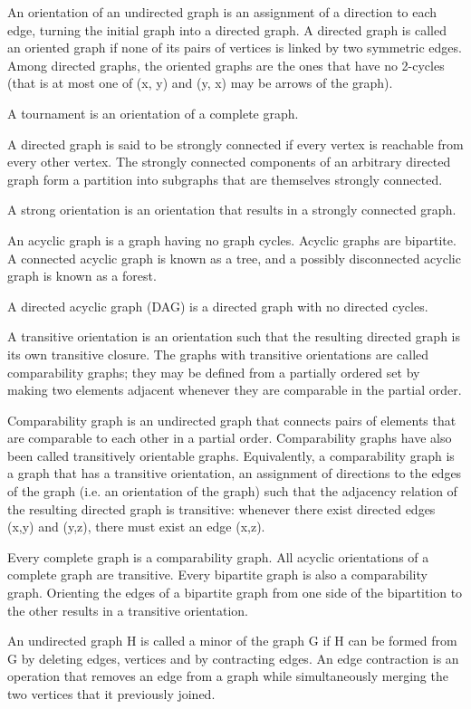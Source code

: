 \documentclass{article}
\begin{document}
An orientation of an undirected graph is an assignment of a direction to each edge, turning the initial graph into a directed graph. A directed graph is called an oriented graph if none of its pairs of vertices is linked by two symmetric edges. Among directed graphs, the oriented graphs are the ones that have no 2-cycles (that is at most one of (x, y) and (y, x) may be arrows of the graph).

A tournament is an orientation of a complete graph.

A directed graph is said to be strongly connected if every vertex is reachable from every other vertex. The strongly connected components of an arbitrary directed graph form a partition into subgraphs that are themselves strongly connected.

A strong orientation is an orientation that results in a strongly connected graph.

An acyclic graph is a graph having no graph cycles. Acyclic graphs are bipartite. A connected acyclic graph is known as a tree, and a possibly disconnected acyclic graph is known as a forest.

A directed acyclic graph (DAG) is a directed graph with no directed cycles.

A transitive orientation is an orientation such that the resulting directed graph is its own transitive closure. The graphs with transitive orientations are called comparability graphs; they may be defined from a partially ordered set by making two elements adjacent whenever they are comparable in the partial order.

Comparability graph is an undirected graph that connects pairs of elements that are comparable to each other in a partial order. Comparability graphs have also been called transitively orientable graphs.
Equivalently, a comparability graph is a graph that has a transitive orientation, an assignment of directions to the edges of the graph (i.e. an orientation of the graph) such that the adjacency relation of the resulting directed graph is transitive: whenever there exist directed edges (x,y) and (y,z), there must exist an edge (x,z).

Every complete graph is a comparability graph. All acyclic orientations of a complete graph are transitive. Every bipartite graph is also a comparability graph. Orienting the edges of a bipartite graph from one side of the bipartition to the other results in a transitive orientation.

An undirected graph H is called a minor of the graph G if H can be formed from G by deleting edges, vertices and by contracting edges. An edge contraction is an operation that removes an edge from a graph while simultaneously merging the two vertices that it previously joined.
\end{document}
